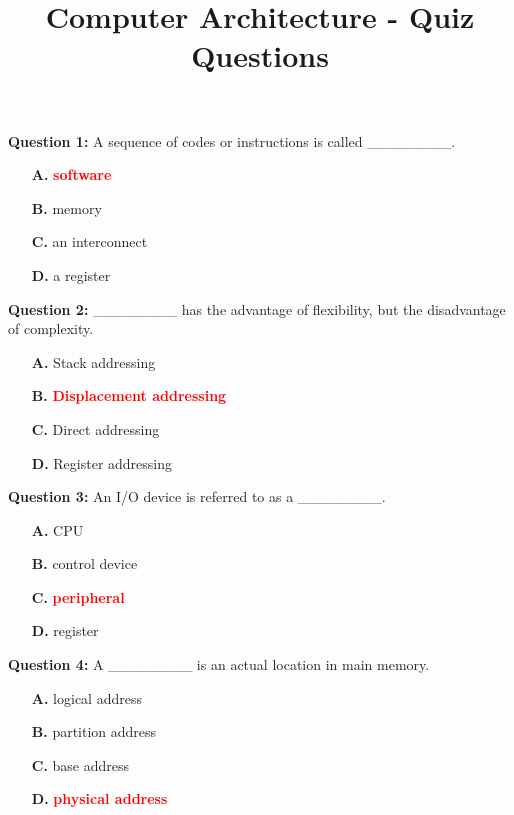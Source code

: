 \documentclass[12pt,a4paper]{article}
\begin{document}
\title{Computer Architecture - Quiz Questions}
\date{}
\maketitle

\textbf{Question 1:} A sequence of codes or instructions is called ________.

\begin{itemize}
    \item[\textbf{A.}] \textcolor{red}{\textbf{software}}
    \item[\textbf{B.}] memory
    \item[\textbf{C.}] an interconnect
    \item[\textbf{D.}] a register
\end{itemize}

\vspace{0.5cm}

\textbf{Question 2:} ________ has the advantage of flexibility, but the disadvantage of complexity.

\begin{itemize}
    \item[\textbf{A.}] Stack addressing
    \item[\textbf{B.}] \textcolor{red}{\textbf{Displacement addressing}}
    \item[\textbf{C.}] Direct addressing
    \item[\textbf{D.}] Register addressing
\end{itemize}

\vspace{0.5cm}

\textbf{Question 3:} An I/O device is referred to as a ________.

\begin{itemize}
    \item[\textbf{A.}] CPU
    \item[\textbf{B.}] control device
    \item[\textbf{C.}] \textcolor{red}{\textbf{peripheral}}
    \item[\textbf{D.}] register
\end{itemize}

\vspace{0.5cm}

\textbf{Question 4:} A ________ is an actual location in main memory.

\begin{itemize}
    \item[\textbf{A.}] logical address
    \item[\textbf{B.}] partition address
    \item[\textbf{C.}] base address
    \item[\textbf{D.}] \textcolor{red}{\textbf{physical address}}
\end{itemize}
\end{document}
